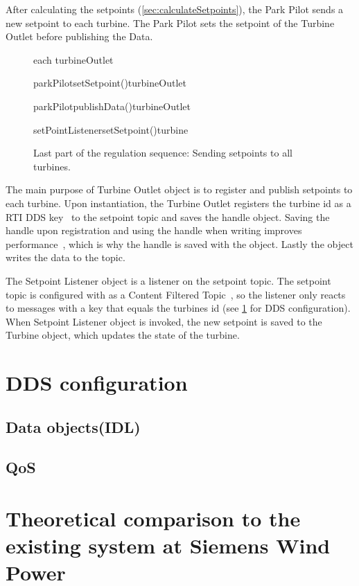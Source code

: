After calculating the setpoints (\cref{sec:calculateSetpoints}), the Park Pilot sends a new setpoint to each turbine. The Park Pilot sets the setpoint of the Turbine Outlet before publishing the Data.

\begin{figure}
	\centering
	\begin{sequencediagram} %
	
		\begin{sdblock}{each turbineOutlet}{}
			\begin {call}{parkPilot}{setSetpoint()}{turbineOutlet}{}
			\end {call}
			\begin {call}{parkPilot}{publishData()}{turbineOutlet}{}
				\begin {call}{setPointListener}{setSetpoint()}{turbine}{}
				\end {call}
			\end {call}
		\end{sdblock}				
	\end{sequencediagram}

	\caption[Regulator calculation sequence]{
		\label{fig:sendSetpoints} 
		\footnotesize{%
			Last part of the regulation sequence: Sending setpoints to all turbines.
		}
	}
\end{figure}

The main purpose of Turbine Outlet object is to register and publish setpoints to each turbine. Upon instantiation, the Turbine Outlet registers the turbine id as a RTI DDS key~\cite{rtiConnextUsersManual} to the setpoint topic and saves the handle object. Saving the handle upon registration and using the handle when writing improves performance~\cite{DDSInstanceHandlet}, which is why the handle is saved with the object. Lastly the object writes the data to the topic.

The Setpoint Listener object is a listener on the setpoint topic. The setpoint topic is configured with as a Content Filtered Topic~\cite{rtiConnextUsersManual}, so the listener only reacts to messages with a key that equals the turbines id (see \cref{sec:ddsConfigCen} for DDS configuration). When Setpoint Listener object is invoked, the new setpoint is saved to the Turbine object, which updates the state of the turbine.

\section{DDS configuration}\label{sec:ddsConfigCen} 

\subsection{Data objects(IDL)}

\subsection{QoS}


\section{Theoretical comparison to the existing system at Siemens Wind Power}
